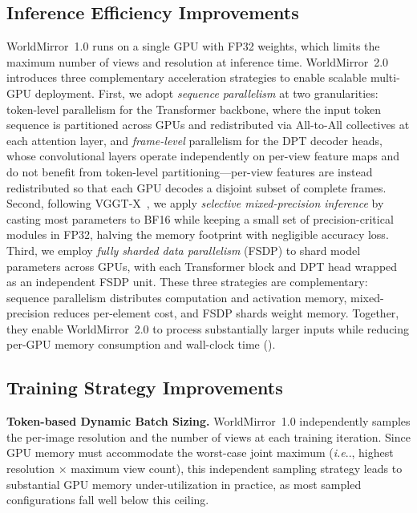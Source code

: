 \documentclass{article} %
\makeatletter
\DeclareRobustCommand\onedot{\futurelet\@let@token\@onedot}
\def\@onedot{\ifx\@let@token.\else.\null\fi\xspace}
\def\ie{\emph{i.e}\onedot} \def\Ie{\emph{I.e}\onedot}
\makeatother
\begin{document}
\subsection{Inference Efficiency Improvements}
\label{sec:inference_efficiency}

WorldMirror~1.0 runs on a single GPU with FP32 weights, which limits the maximum number of views and resolution at inference time. WorldMirror~2.0 introduces three complementary acceleration strategies to enable scalable multi-GPU deployment. First, we adopt \emph{sequence parallelism} at two granularities: token-level parallelism for the Transformer backbone, where the input token sequence is partitioned across GPUs and redistributed via All-to-All collectives at each attention layer, and \emph{frame-level} parallelism for the DPT decoder heads, whose convolutional layers operate independently on per-view feature maps and do not benefit from token-level partitioning---per-view features are instead redistributed so that each GPU decodes a disjoint subset of complete frames. Second, following VGGT-X~\cite{wang2025vggt}, we apply \emph{selective mixed-precision inference} by casting most parameters to BF16 while keeping a small set of precision-critical modules in FP32, halving the memory footprint with negligible accuracy loss. Third, we employ \emph{fully sharded data parallelism} (FSDP) to shard model parameters across GPUs, with each Transformer block and DPT head wrapped as an independent FSDP unit. These three strategies are complementary: sequence parallelism distributes computation and activation memory, mixed-precision reduces per-element cost, and FSDP shards weight memory. Together, they enable WorldMirror~2.0 to process substantially larger inputs while reducing per-GPU memory consumption and wall-clock time ().

\subsection{Training Strategy Improvements}
\label{sec:training_improvements}

\textbf{Token-based Dynamic Batch Sizing.}
\label{sec:token_batch}
WorldMirror~1.0 independently samples the per-image resolution and the number of views at each training iteration. Since GPU memory must accommodate the worst-case joint maximum (\ie, highest resolution $\times$ maximum view count), this independent sampling strategy leads to substantial GPU memory under-utilization in practice, as most sampled configurations fall well below this ceiling.
\end{document}
